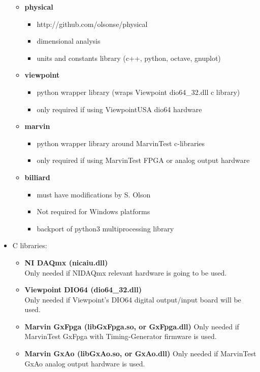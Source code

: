 \begin{itemize}
\begin{itemize}
      \item \textbf{physical}
        \begin{itemize}
          \item http://github.com/olsonse/physical
          \item dimensional analysis
          \item units and constants library (c++, python, octave, gnuplot)
        \end{itemize}

      \item \textbf{viewpoint}
        \begin{itemize}
          \item python wrapper library (wraps Viewpoint dio64\_32.dll c library)
          \item only required if using ViewpointUSA dio64 hardware
        \end{itemize}

      \item \textbf{marvin}
        \begin{itemize}
          \item python wrapper library around MarvinTest c-libraries
          \item only required if using MarvinTest FPGA or analog output hardware
        \end{itemize}

      \item \textbf{billiard}
        \begin{itemize}
          \item must have modifications by S. Olson
          \item Not required for Windows platforms
          \item backport of python3 multiprocessing library
        \end{itemize}
    \end{itemize}

  \item C libraries:
    \begin{itemize}
    \item \textbf{NI DAQmx (nicaiu.dll)} \\
      Only needed if NIDAQmx relevant hardware is going to be used.
    \item \textbf{Viewpoint DIO64 (dio64\_32.dll)} \\
      Only needed if Viewpoint's DIO64 digital output/input board will be used.
    \item \textbf{Marvin GxFpga (libGxFpga.so, or GxFpga.dll)}
      Only needed if MarvinTest GxFpga with  Timing-Generator
      firmware is used.
    \item \textbf{Marvin GxAo (libGxAo.so, or GxAo.dll)}
      Only needed if MarvinTest GxAo analog output hardware is used.
    \end{itemize}
\end{itemize}

